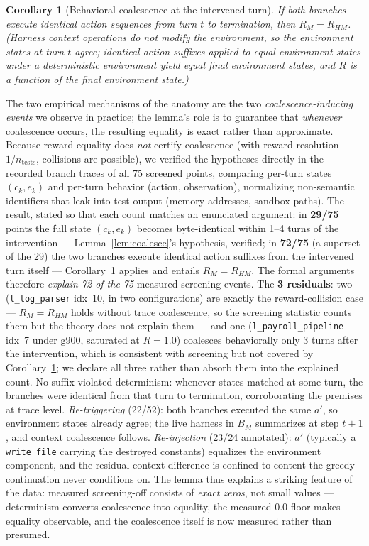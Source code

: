 \documentclass{article}
\newtheorem{corollary}{Corollary}
\theoremstyle{remark}
\begin{document}
\begin{corollary}[Behavioral coalescence at the intervened turn]
\label{cor:behav}
If both branches execute identical action sequences from turn $t$ to
termination, then $R_M = R_{HM}$. (Harness context operations do not modify
the environment, so the environment states at turn $t$ agree; identical
action suffixes applied to equal environment states under a deterministic
environment yield equal final environment states, and $R$ is a function of
the final environment state.)
\end{corollary}

The two empirical mechanisms of the anatomy are the two
\emph{coalescence-inducing events} we observe in practice; the lemma's role
is to guarantee that \emph{whenever} coalescence occurs, the resulting
equality is exact rather than approximate. Because reward equality does
\emph{not} certify coalescence (with reward resolution $1/n_{\text{tests}}$,
collisions are possible), we verified the hypotheses directly in the
recorded branch traces of all 75 screened points, comparing per-turn states
$(c_k, e_k)$ and per-turn behavior (action, observation), normalizing
non-semantic identifiers that leak into test output (memory addresses,
sandbox paths). The result, stated so that each count matches an enunciated
argument: in \textbf{29/75} points the full state $(c_k, e_k)$ becomes
byte-identical within 1--4 turns of the intervention ---
Lemma~\ref{lem:coalesce}'s hypothesis, verified; in \textbf{72/75}
(a superset of the 29) the two branches execute identical action suffixes
from the intervened turn itself --- Corollary~\ref{cor:behav} applies and
entails $R_M = R_{HM}$. The formal arguments therefore \emph{explain 72 of
the 75} measured screening events. The \textbf{3 residuals}: two
(\texttt{l\_log\_parser} idx~10, in two configurations) are exactly the
reward-collision case --- $R_M = R_{HM}$ holds without trace coalescence, so
the screening statistic counts them but the theory does not explain them ---
and one (\texttt{l\_payroll\_pipeline} idx~7 under g900, saturated at
$R = 1.0$) coalesces behaviorally only 3 turns after the intervention, which
is consistent with screening but not covered by
Corollary~\ref{cor:behav}; we declare all three rather than absorb them into
the explained count. No suffix violated
determinism: whenever states matched at some turn, the branches were
identical from that turn to termination, corroborating the premises at trace
level. \emph{Re-triggering} (22/52): both branches executed the same $a'$,
so environment states already agree; the live harness in $B_M$ summarizes at
step $t{+}1$, and context coalescence follows. \emph{Re-injection} (23/24
annotated): $a'$ (typically a \texttt{write\_file} carrying the destroyed
constants) equalizes the environment component, and the residual context
difference is confined to content the greedy continuation never conditions
on. The lemma thus explains a striking feature of the data: measured
screening-off consists of \emph{exact zeros}, not small values ---
determinism converts coalescence into equality, the measured $0.0$ floor
makes equality observable, and the coalescence itself is now measured
rather than presumed.
\end{document}

